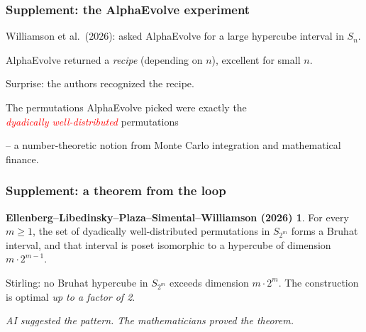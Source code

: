 \documentclass{beamer}
\theoremstyle{definition}
\newtheorem*{WilliamsonResult}{Ellenberg--Libedinsky--Plaza--Simental--Williamson (2026)}
\newcommand\remph[1]{\emph{\textcolor{red}{#1}}}
\begin{document}

\begin{frame}[noframenumbering]
  \frametitle{Supplement: the AlphaEvolve experiment}
  Williamson et al.\ (2026): asked AlphaEvolve for a large hypercube
  interval in \( S_n \).
  \pause
  \vspace{.3cm}

  AlphaEvolve returned a \emph{recipe} (depending on \( n \)),
  excellent for small \( n \).
  \pause
  \vspace{.3cm}

  Surprise: the authors recognized the recipe.
  \pause
  \vspace{.2cm}

  \begin{center}
    The permutations AlphaEvolve picked were exactly the\\
    \remph{dyadically well-distributed} permutations
  \end{center}
  -- a number-theoretic notion from Monte Carlo integration
  and mathematical finance.
\end{frame}


\begin{frame}[noframenumbering]
  \frametitle{Supplement: a theorem from the loop}
  \begin{WilliamsonResult}
    For every \( m \ge 1 \), the set of dyadically well-distributed
    permutations in \( S_{2^m} \) forms a Bruhat interval, and that
    interval is poset isomorphic to a hypercube of dimension
    \( m \cdot 2^{m-1} \).
  \end{WilliamsonResult}
  \pause
  \vspace{.3cm}

  Stirling: no Bruhat hypercube in \( S_{2^m} \) exceeds dimension
  \( m \cdot 2^m \). The construction is optimal \emph{up to a factor of 2}.
  \pause
  \vspace{.3cm}

  \begin{center}
    \emph{AI suggested the pattern. The mathematicians proved the theorem.}
  \end{center}
\end{frame}
\end{document}
